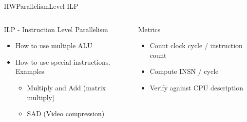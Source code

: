 %
\begin{Frame}{HWParallelismLevel ILP}
  \begin{columns}[t]
    \begin{column}{5cm} %
      \begin{block}{ILP - Instruction Level Parallelism}
        \begin{itemize}
        \item How to use multiple ALU
        \item How to use special instructions. Examples
          \begin{itemize}
          \item Multiply and Add (matrix multiply)
          \item SAD (Video compression)
          \end{itemize}
        \end{itemize}
      \end{block} 
    \end{column}
    
    \begin{column}{5cm} %
      \begin{alertblock}{Metrics}
        \begin{itemize}
        \item Count clock cycle / instruction count
        \item Compute INSN / cycle
        \item Verify against CPU description
        \end{itemize}
      \end{alertblock}   
    \end{column}
  \end{columns}  
\end{Frame}


